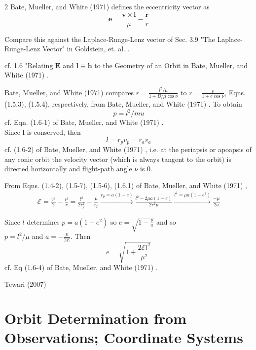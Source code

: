 \documentclass[10pt]{amsart}
\begin{document}
\begin{multicols*}{2}
Bate, Mueller, and White (1971) \cite{BMW1971} defines the eccentricity vector as 
\[
\mathbf{e} = \frac{ \mathbf{v} \times \mathbf{l} }{ \mu} - \frac{\mathbf{r}}{r}
\]

Compare this against the Laplace-Runge-Lenz vector of Sec. 3.9 "The Laplace-Runge-Lenz Vector" in Goldstein, et. al. \cite{HGoldsteinCPooleJSafko2001}.

cf. 1.6 "Relating $\mathbf{E}$ and $\mathbf{l} \equiv \mathbf{h}$ to the Geometry of an Orbit in Bate, Mueller, and White (1971) \cite{BMW1971}.

Bate, Mueller, and White (1971) \cite{BMW1971} compares $r = \frac{ l^2 / \mu}{ 1 + B/\mu \cos{\nu }} $  to $r = \frac{p}{ 1 + e \cos{\nu}} $, Eqns. (1.5.3), (1.5.4), respectively, from Bate, Mueller, and White (1971) \cite{BMW1971}. To obtain
\begin{equation}
	p = l^2 /mu 
\end{equation}
cf. Eqn. (1.6-1) of Bate, Mueller, and White (1971) \cite{BMW1971}.  \\

Since $\mathbf{l}$ is conserved, then 
\begin{equation}
	l = r_p v_p = r_a v_a
\end{equation}
cf. (1.6-2) of Bate, Mueller, and White (1971) \cite{BMW1971}, i.e. at the periapsis or apoapsis of any conic orbit the velocity vector (which is always tangent to the orbit) is directed horizontally and flight-path angle $\nu$ is $0$.

From Eqns. (1.4-2), (1.5-7), (1.5-6), (1.6.1) of Bate, Mueller, and White (1971) \cite{BMW1971},
\[
\begin{gathered}
	\mathcal{E} = \frac{v^2}{2 }  - \frac{\mu}{r} = \frac{l^2}{ 2 r_p^2 } - \frac{\mu}{r_p} \xrightarrow{r_p = a(1-e) }  \frac{ l^2 - 2\mu a(1-e) }{ 2 r^2 p} \xrightarrow{ l^2 = \mu a ( 1- e^2) } \frac{- \mu}{2 a}
\end{gathered}
\]

Since $l$ determines $p = a(1-e^2)$ so $e = \sqrt{ 1 - \frac{p}{a} }$ and so \\
$p = l^2 / \mu$ and $a = - \frac{\mu}{2E}$. Then 
\begin{equation}
	e = \sqrt{ 1 + \frac{2 \mathcal{E} l^2 }{\mu^2} }
\end{equation}
cf. Eq (1.6-4) of Bate, Mueller, and White (1971) \cite{BMW1971}.

Tewari (2007) \cite{Tewa2007}


\section{Orbit Determination from Observations; Coordinate Systems}


\end{multicols*}
\end{document}
